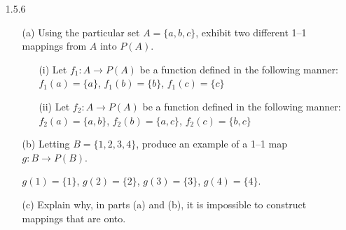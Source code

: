 \documentclass[12pt,letterpaper]{article}
\begin{document}
\begin{itemize}[leftmargin=!,labelindent=5pt]
\begin{itemize}
                $P(A) = \{ \emptyset, \{a\}, \{b\}, \{c\}, \{a, b\}, \{b, c\}, \{a, c\}, \{a, b, c\}\}$
                \item [(b)] If $A$ is finite with $n$ elements, show that $P(A)$ has $2^n$ elements. (Constructing a particular subset of $A$ can be interpreted as making a series of decisions about whether or not to include each element of $A$.)
                    \begin{proof}
                        Let $A$ be a finite set with $n$ elements.
                        $P(A)$ is defined to be the set containing every subset of $A$.
                        When creating a subset of $A$, every element of $A$ is either in the subset or not in the subset -- there are strictly 2 choices.
                        Since there are $n$ elements in $A$, there are a total of $2^n$ choices, and each one makes a unique subset of $A$.
                        Thus, $P(A)$ has $2^n$ elements.
                    \end{proof}
            \end{itemize}
        \newpage
        \item[1.5.6]
            \begin{itemize}
                \item [(a)] Using the particular set $A = \{a, b, c\}$, exhibit two different 1–1 mappings from $A$ into $P(A)$.
                    \begin{itemize}
                        \item [(i)] Let $f_1: A \to P(A)$ be a function defined in the following manner: $f_1(a) = \{a\}$, $f_1(b) = \{b\}$, $f_1(c) = \{c\}$
                        \item [(ii)] Let $f_2: A \to P(A)$ be a function defined in the following manner: $f_2(a) = \{a,b\}$, $f_2(b) = \{a,c\}$, $f_2(c) = \{b,c\}$
                    \end{itemize}
                \item [(b)] Letting $B = \{1,2,3,4\}$, produce an example of a 1–1 map $g : B \to P(B)$.
                
                $g(1) = \{1\}$, $g(2) = \{2\}$, $g(3) = \{3\}$, $g(4) = \{4\}$.
                \item [(c)] Explain why, in parts (a) and (b), it is impossible to construct mappings that are onto.
                

\end{itemize}
\end{itemize}
\end{document}
